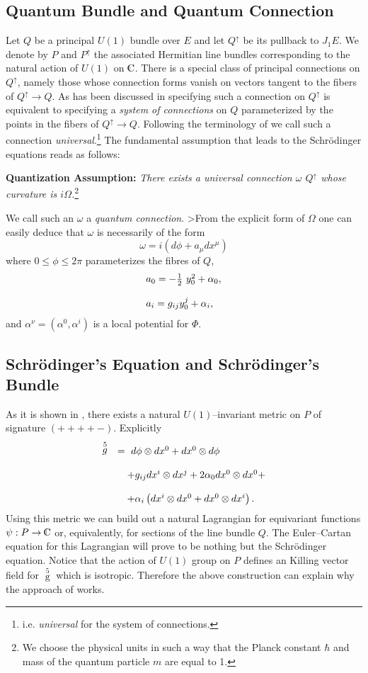 \documentclass[12pt]{article}
\def\complex{{\kern .1em {\raise .47ex \hbox
{$\scriptscriptstyle
|$}}
\kern -.4em {\rm C}}}
\begin{document}
\subsection{Quantum Bundle and Quantum Connection}

Let $Q$ be a principal $U (1)$ bundle over $E$
and let $Q^{\uparrow}$ be its pullback to $J_{1}E$. 
We denote by $P$ and $P^{\uparrow}$ the associated Hermitian
line bundles corresponding to the natural action of $U (1)$ on 
$\complex$.  There is a special class of principal connections on
$Q^{\uparrow}$,  namely those whose connection forms vanish on
vectors tangent to the fibers of $Q^{\uparrow} \to
 Q$.  As has
been discussed in \cite{mod}
specifying such a connection on
$Q^{\uparrow}$ is equivalent to specifying a {\em system of
connections} on $Q$ parameterized by the points in the fibers of
$Q^{\uparrow} \to Q$.  Following the terminology of \cite{mod} we
call such a connection {\em universal}.\footnote{i.e.  {\em
universal} for the system of connections.}
The fundamental assumption that leads to the Schr\"{o}dinger
equations  reads as follows:

\medskip
\noindent
{\bf Quantization Assumption: }
{\em There exists a universal connection
$\omega$  $Q^{\uparrow}$ whose curvature is
$i\Omega$.}\footnote{We choose the physical units in such a way
that the Planck constant
$\hbar$ and mass of the quantum particle $m$ are equal to 1. }

We call such an $\omega$ a {\em quantum connection}. 
>From the explicit
form of $\Omega$ one can easily deduce that $\omega$ is
necessarily of the form
$$
\omega = i\left ( d \phi + a_{\mu} dx^{\mu}\right)
$$
where $0\leq \phi \leq 2\pi$ parameterizes the fibres of $Q$, 
$$
\begin{array}{l}
a_{0} = - {1\over 2} \ y^{2}_{0} + \alpha_{0} ,  \cr\cr
a_{i} =  g_{ij} y^{j}_{0} + \alpha_{i} ,  
\end{array}
$$
and $\alpha^{\nu} = \left (\alpha^{0}, \alpha^{i}\right)$ is a local
potential for $\Phi$. 
\subsection{Schr\"{o}dinger's Equation and Schr\"{o}dinger's Bundle}

As it is shown in \cite{jamo},  there exists a natural $U (1)$--invariant
metric on $P$ of signature $ (++++-)$.  Explicitly 
$$
\begin{array}{ll}
\displaystyle\mathop{g}\limits^{5}
&  =\   d\phi \otimes dx^{0} + dx^{0} \otimes d\phi
\cr\cr
& \quad +g_{ij}dx^{i}\otimes dx^{j} + 2 \alpha_{0}
dx^{0}\otimes  dx^{0} + \cr\cr
& \quad + \alpha_{i}
\left ( dx^{i}\otimes dx^{0} + dx^{0}\otimes dx^{i} \right) . 
\end{array}
$$
Using this metric we can build out a natural Lagrangian for
equivariant functions $\psi :  P \rightarrow \complex$ or, 
equivalently,  for sections of the line bundle $Q$.  The Euler--Cartan
equation for this Lagrangian will prove to be  nothing but the
Schr\"{o}dinger equation.  Notice that the action of $U (1)$ group
on $P$ defines
an Killing vector field for $\mathop{g}\limits^{5}$ which is isotropic.
Therefore the above construction can explain why the
approach of \cite{duv} works.
\end{document}
